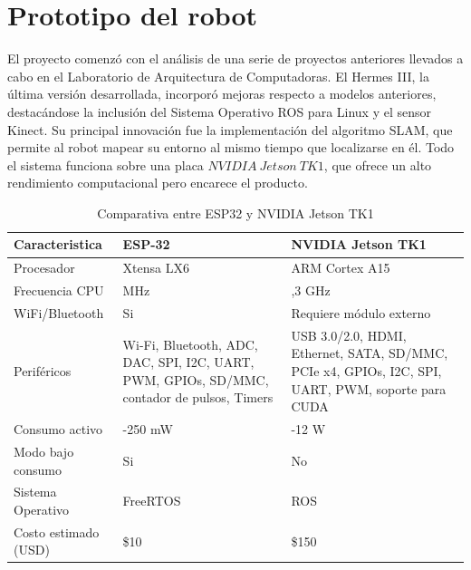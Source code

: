 \section{Prototipo del robot}

El proyecto comenzó con el análisis de una serie de proyectos anteriores llevados a cabo en el Laboratorio de Arquitectura de Computadoras. El Hermes III, la última versión desarrollada, incorporó mejoras respecto a modelos anteriores, destacándose la inclusión del Sistema Operativo ROS para Linux y el sensor Kinect. Su principal innovación fue la implementación del algoritmo SLAM, que permite al robot mapear su entorno al mismo tiempo que localizarse en él. \cite{micolini2022hermes} Todo el sistema funciona sobre una placa $NVIDIA\ Jetson\ TK1$, que ofrece un alto rendimiento computacional pero encarece el producto.

\begin{table}[htpb]
	\begin{center}
    	\begin{tabular} {
        	| >{\centering\arraybackslash}m{2.2cm}
        	| >{\centering\arraybackslash}m{2.65cm}
        	| >{\centering\arraybackslash}m{2.65cm} |}
        	\hline \rowcolor{test_header_color}
            	Caracteristica & ESP-32 & NVIDIA Jetson TK1\\
        	\hline
            	Procesador & Xtensa LX6 & ARM Cortex A15 \\
        	\hline
            	Frecuencia CPU & 240 MHz & 2,3 GHz \\
        	\hline
            	WiFi/Bluetooth & Si & Requiere módulo externo \\
        	\hline
            	Periféricos & {Wi-Fi, Bluetooth, ADC, DAC, SPI, I2C, UART, PWM, GPIOs, SD/MMC, contador de pulsos, Timers} & {USB 3.0/2.0, HDMI, Ethernet, SATA, SD/MMC, PCIe x4, GPIOs, I2C, SPI, UART, PWM, soporte para CUDA} \\
        	\hline
            	Consumo activo & 160-250 mW & 10-12 W \\
        	\hline
            	Modo bajo consumo & Si & No \\
        	\hline
            	Sistema Operativo & FreeRTOS & ROS \\
        	\hline
            	Costo estimado (USD) & \$10 & \$150 \\
        	\hline
    	\end{tabular}
	\caption{Comparativa entre ESP32 y NVIDIA Jetson TK1}
	\label{tab:comparativa_esp32_jetson}
	\end{center}
\end{table}

